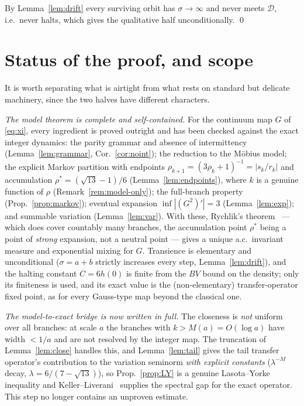 \documentclass[11pt]{article}
\theoremstyle{definition}\newtheorem{definition}{Definition}
\theoremstyle{remark}\newtheorem{remark}{Remark}
\newcommand{\D}{\mathcal D}\newcommand{\Leb}{\mathrm{Leb}}
\begin{document}
By Lemma~\ref{lem:drift} every surviving orbit has $\sigma\to\infty$ and never
meets $\D$, i.e.\ never halts, which gives the qualitative half
unconditionally. \qed

\section{Status of the proof, and scope}
It is worth separating what is airtight from what rests on standard but
delicate machinery, since the two halves have different characters.

\emph{The model theorem is complete and self-contained.} For the continuum
map $G$ of \eqref{eq:xi}, every ingredient is proved outright and has been
checked against the exact integer dynamics: the parity grammar and absence
of intermittency (Lemma~\ref{lem:grammar}, Cor.~\ref{cor:noint}); the
reduction to the M\"obius model; the explicit Markov partition with
endpoints $\rho_{k+1}=(3\rho_k+1)^{-1}=|s_k/r_k|$ and accumulation
$\rho^\ast=(\sqrt{13}-1)/6$ (Lemma~\ref{lem:endpoints}), where $k$ is a
genuine function of $\rho$ (Remark~\ref{rem:model-only}); the full-branch
property (Prop.~\ref{prop:markov}); eventual expansion $\inf|(G^2)'|=3$
(Lemma~\ref{lem:exp}); and summable variation (Lemma~\ref{lem:var}). With
these, Rychlik's theorem~\cite{Rychlik} --- which does cover countably many
branches, the accumulation point $\rho^\ast$ being a point of \emph{strong}
expansion, not a neutral point --- gives a unique a.c.\ invariant measure
and exponential mixing for $G$. Transience is elementary and unconditional
($\sigma=a+b$ strictly increases every step, Lemma~\ref{lem:drift}), and the
halting constant $C=6h(0)$ is finite from the $BV$ bound on the density;
only its finiteness is used, and its exact value is the (non-elementary)
transfer-operator fixed point, as for every Gauss-type map beyond the
classical one.

\emph{The model-to-exact bridge is now written in full.} The closeness is
\emph{not} uniform over all branches: at scale $a$ the branches with
$k>M(a)=O(\log a)$ have width $<1/a$ and are not resolved by the integer map.
The truncation of Lemma~\ref{lem:close} handles this, and
Lemma~\ref{lem:tail} gives the tail transfer operator's contribution to the
variation seminorm \emph{with explicit constants} ($\lambda^{-M}$ decay,
$\lambda=6/(7-\sqrt{13})$), so Prop.~\ref{prop:LY} is a genuine
Lasota--Yorke inequality and Keller--Liverani~\cite{KL} supplies the spectral
gap for the exact operator. This step no longer contains an unproven
estimate.
\end{document}
